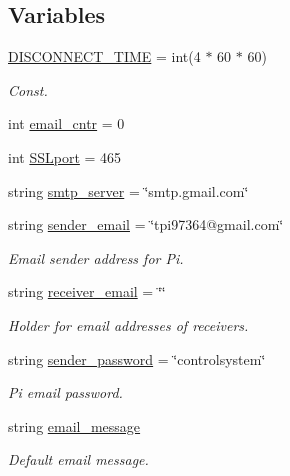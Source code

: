\subsection*{Variables}
\begin{DoxyCompactItemize}
\item 
\hyperlink{namespace_s_q_lfunction_a68f53c3db854695a6e4a30a3a55594b4}{D\+I\+S\+C\+O\+N\+N\+E\+C\+T\+\_\+\+T\+I\+ME} = int(4 $\ast$ 60 $\ast$ 60)
\begin{DoxyCompactList}\small\item\em Const. \end{DoxyCompactList}\item 
int \hyperlink{namespace_s_q_lfunction_aef9c9d6f38d6ad20fa3572f211e29b04}{email\+\_\+cntr} = 0
\item 
int \hyperlink{namespace_s_q_lfunction_a700c01c62cb7f1ed2561f5e640da46cf}{S\+S\+Lport} = 465
\item 
string \hyperlink{namespace_s_q_lfunction_afc238002d1e4aeb7f8d2e10d47dfad36}{smtp\+\_\+server} = \char`\"{}smtp.\+gmail.\+com\char`\"{}
\item 
string \hyperlink{namespace_s_q_lfunction_ac63d06248a3e41c104ae1290bb403c78}{sender\+\_\+email} = \char`\"{}tpi97364@gmail.\+com\char`\"{}
\begin{DoxyCompactList}\small\item\em Email sender address for Pi. \end{DoxyCompactList}\item 
string \hyperlink{namespace_s_q_lfunction_a51ebdaf9d64f52b2c266a49020cf12a5}{receiver\+\_\+email} = \char`\"{}\char`\"{}
\begin{DoxyCompactList}\small\item\em Holder for email addresses of receivers. \end{DoxyCompactList}\item 
string \hyperlink{namespace_s_q_lfunction_a0d308a95029254ed328ba365861abdf2}{sender\+\_\+password} = \char`\"{}controlsystem\char`\"{}
\begin{DoxyCompactList}\small\item\em Pi email password. \end{DoxyCompactList}\item 
string \hyperlink{namespace_s_q_lfunction_ae767f70baa76040d2b29bd6eeefd7bbe}{email\+\_\+message}
\begin{DoxyCompactList}\small\item\em Default email message. \end{DoxyCompactList}\item 

\end{DoxyCompactItemize}
